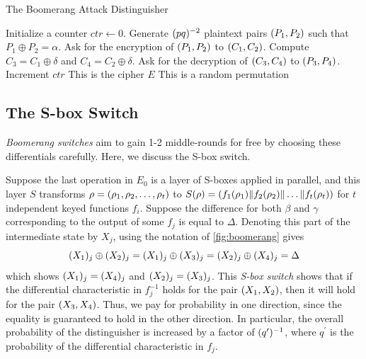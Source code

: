 \documentclass[twoside]{article}
\begin{document}
\begin{algorithm}
    \caption{The Boomerang Attack Distinguisher}
    \label{alg:boomerang-dist}
    \begin{algorithmic}[1]
        \State Initialize a counter \(ctr \gets 0\). 
        \State Generate \((pq)^{-2}\) plaintext pairs \((P_1, P_2)\)
        such that \(P_1 \oplus P_2 = \alpha\).
            \State Ask for the encryption of \((P_1, P_2)\) to \((C_1,
            C_2)\).
            \State Compute \(C_3 = C_1 \oplus \delta\) and \(C_4 = C_2 \oplus 
            \delta\). 
            \State Ask for the decryption of \((C_3, C_4)\) to \((P_3,
            P_4)\).
                \State Increment \(ctr\)
            \EndIf
        \EndFor
            \State \Return This is the cipher \(E\)
        \Else
            \State \Return This is a random permutation
        \EndIf
    \end{algorithmic}
\end{algorithm}

\subsection{The S-box Switch}

\emph{Boomerang switches} aim to gain 1-2 middle-rounds for free by choosing
these differentials carefully. Here, we discuss the S-box switch.

Suppose the last operation in \(E_0\) is a layer of S-boxes applied in parallel,
and this layer \(S\) transforms \(\rho = (\rho_1, \rho_2, \ldots, \rho_t)\)
to \(S(\rho) =
(f_1(\rho_1)\|f_2(\rho_2)\|\ldots\|f_t(\rho_t))\) for \(t\)
independent keyed functions \(f_i\). Suppose the difference for both \(\beta\)
and \(\gamma\) corresponding to the output of some \(f_j\) is equal to
\(\Delta\). Denoting this part of the intermediate state by \(X_j\), using the
notation of \autoref{fig:boomerang} gives
\begin{equation}
    (X_1)_j \oplus (X_2)_j = (X_1)_j \oplus (X_3)_j = (X_2)_j \oplus (X_4)_j = \Delta
    \label{eq:s-switch}
\end{equation}
which shows \((X_1)_j = (X_4)_j\) and \((X_2)_j = (X_3)_j\).
This \emph{S-box switch} shows that if the differential characteristic in
\(f_j^{-1}\) holds for the pair \((X_1, X_2)\), then it will hold for the
pair \((X_3, X_4)\). Thus, we pay for probability in one direction, since
the equality is guaranteed to hold in the other direction. In particular, the
overall probability of the distinguisher is increased by a factor of
\((q^\prime)^{-1}\), where \(q^\prime\) is the probability of the
differential characteristic in \(f_j\).
\end{document}
